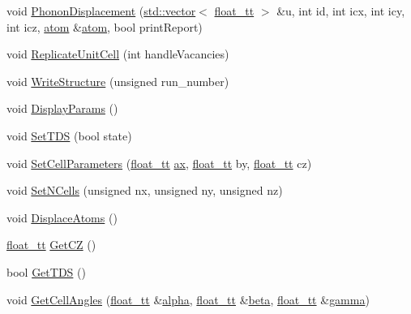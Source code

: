 \begin{DoxyCompactItemize}
\item 
void \hyperlink{class_q_s_t_e_m_1_1_c_crystal_a62c1eac3fe7735169ab5e4ed4e3d1aab}{Phonon\-Displacement} (\hyperlink{qmb_8m_af54b69a32590de218622e869b06b47b3}{std\-::vector}$<$ \hyperlink{namespace_q_s_t_e_m_a915d7caa497280d9f927c4ce8d330e47}{float\-\_\-tt} $>$ \&u, int id, int icx, int icy, int icz, \hyperlink{namespace_q_s_t_e_m_a402dabc31a7a1fe906d0cdd138c69686}{atom} \&\hyperlink{namespace_q_s_t_e_m_a402dabc31a7a1fe906d0cdd138c69686}{atom}, bool print\-Report)
\item 
void \hyperlink{class_q_s_t_e_m_1_1_c_crystal_ad637f22339aae80af2ce0641e490fac3}{Replicate\-Unit\-Cell} (int handle\-Vacancies)
\item 
void \hyperlink{class_q_s_t_e_m_1_1_c_crystal_a0ce0de40928b937b81f310dbf547f299}{Write\-Structure} (unsigned run\-\_\-number)
\item 
void \hyperlink{class_q_s_t_e_m_1_1_c_crystal_a8998c76d06e62c9fdffd0f03441474a7}{Display\-Params} ()
\item 
void \hyperlink{class_q_s_t_e_m_1_1_c_crystal_adf9beb096289c07da4dfe1308dfb410a}{Set\-T\-D\-S} (bool state)
\item 
void \hyperlink{class_q_s_t_e_m_1_1_c_crystal_afe682440428036f5aa0b26aad0bf25c7}{Set\-Cell\-Parameters} (\hyperlink{namespace_q_s_t_e_m_a915d7caa497280d9f927c4ce8d330e47}{float\-\_\-tt} \hyperlink{image_sim_8m_a8fa675eb2fcec5b95d9d21c670da7f30}{ax}, \hyperlink{namespace_q_s_t_e_m_a915d7caa497280d9f927c4ce8d330e47}{float\-\_\-tt} by, \hyperlink{namespace_q_s_t_e_m_a915d7caa497280d9f927c4ce8d330e47}{float\-\_\-tt} cz)
\item 
void \hyperlink{class_q_s_t_e_m_1_1_c_crystal_a49d427c85d3c5b0c955d0301852f60b9}{Set\-N\-Cells} (unsigned nx, unsigned ny, unsigned nz)
\item 
void \hyperlink{class_q_s_t_e_m_1_1_c_crystal_a8ded7f3a36b7a4e8ab37a2a70cd22834}{Displace\-Atoms} ()
\item 
\hyperlink{namespace_q_s_t_e_m_a915d7caa497280d9f927c4ce8d330e47}{float\-\_\-tt} \hyperlink{class_q_s_t_e_m_1_1_c_crystal_adbc0f78cf11406cea049895b1926ee05}{Get\-C\-Z} ()
\item 
bool \hyperlink{class_q_s_t_e_m_1_1_c_crystal_a88cfa3d56f85d9748efab882439af2fc}{Get\-T\-D\-S} ()
\item 
void \hyperlink{class_q_s_t_e_m_1_1_c_crystal_a26c4b90462b871fca5e284f5f711ac97}{Get\-Cell\-Angles} (\hyperlink{namespace_q_s_t_e_m_a915d7caa497280d9f927c4ce8d330e47}{float\-\_\-tt} \&\hyperlink{virtual_goniometer_8m_a62197192f0fbf4e0675eb37be1c4c175}{alpha}, \hyperlink{namespace_q_s_t_e_m_a915d7caa497280d9f927c4ce8d330e47}{float\-\_\-tt} \&\hyperlink{virtual_goniometer_8m_ab146b9cbab6e73e7588b240dc709fe01}{beta}, \hyperlink{namespace_q_s_t_e_m_a915d7caa497280d9f927c4ce8d330e47}{float\-\_\-tt} \&\hyperlink{virtual_goniometer_8m_a8d00631c9622112f1877fdb1222c242e}{gamma})

\end{DoxyCompactItemize}
